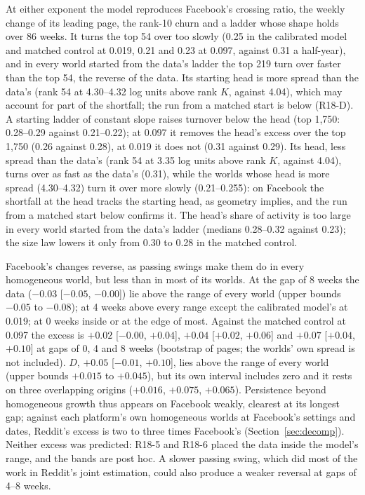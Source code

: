 \documentclass[10pt]{article}
\begin{document}
At either exponent the model reproduces Facebook's crossing ratio, the weekly change of its leading page, the rank-10 churn and a ladder whose shape holds over 86 weeks. It turns the top 54 over too slowly (0.25 in the calibrated model and matched control at 0.019, 0.21 and 0.23 at 0.097, against 0.31 a half-year), and in every world started from the data's ladder the top 219 turn over faster than the top 54, the reverse of the data. Its starting head is more spread than the data's (rank 54 at 4.30--4.32 log units above rank $K$, against 4.04), which may account for part of the shortfall; the run from a matched start is below (R18-D). A starting ladder of constant slope raises turnover below the head (top 1,750: 0.28--0.29 against 0.21--0.22); at 0.097 it removes the head's excess over the top 1,750 (0.26 against 0.28), at 0.019 it does not (0.31 against 0.29). Its head, less spread than the data's (rank 54 at 3.35 log units above rank $K$, against 4.04), turns over as fast as the data's (0.31), while the worlds whose head is more spread (4.30--4.32) turn it over more slowly (0.21--0.255): on Facebook the shortfall at the head tracks the starting head, as geometry implies, and the run from a matched start below confirms it. The head's share of activity is too large in every world started from the data's ladder (medians 0.28--0.32 against 0.23); the size law lowers it only from 0.30 to 0.28 in the matched control.

Facebook's changes reverse, as passing swings make them do in every homogeneous world, but less than in most of its worlds. At the gap of 8 weeks the data ($-0.03$ [$-0.05$, $-0.00$]) lie above the range of every world (upper bounds $-0.05$ to $-0.08$); at 4 weeks above every range except the calibrated model's at 0.019; at 0 weeks inside or at the edge of most. Against the matched control at 0.097 the excess is $+0.02$ [$-0.00$, $+0.04$], $+0.04$ [$+0.02$, $+0.06$] and $+0.07$ [$+0.04$, $+0.10$] at gaps of 0, 4 and 8 weeks (bootstrap of pages; the worlds' own spread is not included). $D$, $+0.05$ [$-0.01$, $+0.10$], lies above the range of every world (upper bounds $+0.015$ to $+0.045$), but its own interval includes zero and it rests on three overlapping origins ($+0.016$, $+0.075$, $+0.065$). Persistence beyond homogeneous growth thus appears on Facebook weakly, clearest at its longest gap; against each platform's own homogeneous worlds at Facebook's settings and dates, Reddit's excess is two to three times Facebook's (Section~\ref{sec:decomp}). Neither excess was predicted: R18-5 and R18-6 placed the data inside the model's range, and the bands are post hoc. A slower passing swing, which did most of the work in Reddit's joint estimation, could also produce a weaker reversal at gaps of 4--8 weeks.
\end{document}
